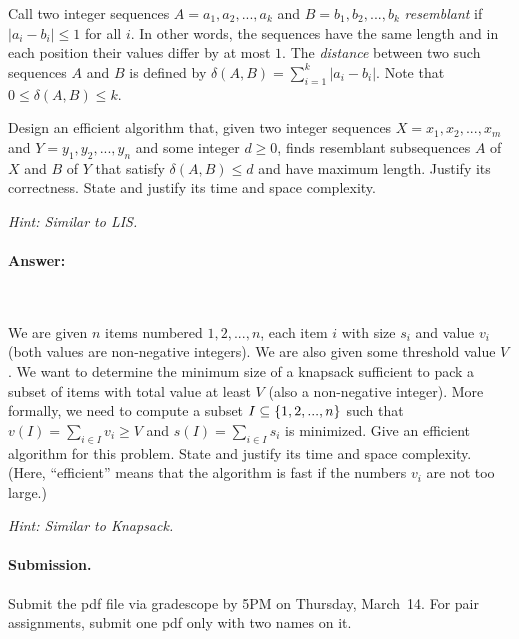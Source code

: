 \documentclass[11pt]{article}
\begin{document}

\begin{problem}
Call two integer sequences $A = a_1,a_2,...,a_k$ and $B = b_1,b_2,...,b_k$ \emph{resemblant}  if $|a_i - b_i| \le 1$ for all $i$. In other words, the sequences have the same length and  in each position their values differ by at most $1$. The \emph{distance} between two such sequences $A$ and $B$ is defined by $\delta(A,B) = \sum_{i=1}^k |a_i - b_i|$. Note that $0 \le \delta(A,B)\le k$.

Design an efficient algorithm that, given two integer sequences $X = x_1,x_2,...,x_m$ and $Y = y_1,y_2,...,y_n$ and some integer $d\ge 0$, 
finds resemblant subsequences $A$ of $X$ and $B$ of $Y$ that satisfy $\delta(A,B) \le d$ 
and have maximum length. Justify its correctness.  State and justify its time and space complexity.  

\noindent\emph{Hint: Similar to LIS.}
\end{problem}

\paragraph{Answer:}\mbox{} \\




\begin{problem}
We are given $n$ items numbered $1,2,...,n$, 
each item $i$ with size $s_i$ and 
value $v_i$ (both values are non-negative integers).
We are also given some
threshold value $V$. We want to determine the 
minimum size of a knapsack sufficient to pack
a subset of items with total value at least $V$ (also a non-negative
integer).
More formally, we need to compute a subset
$I \subseteq {\left\{ 1,2,...,n \right\} }$ such that
$v(I) = \sum_{i\in I} v_i \ge V$ and
$s(I) = \sum_{i\in I} s_i$ is minimized.
Give an efficient algorithm
for this problem. State and justify its time and space complexity.
(Here, ``efficient'' means that
the algorithm is fast if the numbers $v_i$ are 
not too large.) 

\noindent\emph{Hint: Similar to Knapsack.} 
\end{problem}









\vskip 0.3in
\paragraph{Submission.}
Submit the pdf file via gradescope by 5PM on Thursday, March~14.
For pair assignments, submit one pdf only with two names on it.
\end{document}
